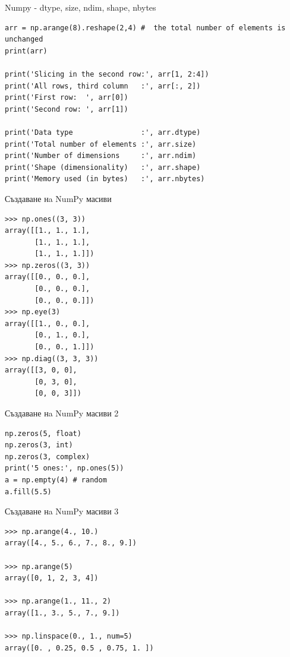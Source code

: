 \documentclass{beamer}
\begin{document}
\begin{frame}[fragile]{Numpy - dtype, size, ndim, shape, nbytes}
\begin{lstlisting}
arr = np.arange(8).reshape(2,4) #  the total number of elements is unchanged
print(arr)

print('Slicing in the second row:', arr[1, 2:4]) 
print('All rows, third column   :', arr[:, 2])
print('First row:  ', arr[0])
print('Second row: ', arr[1])

print('Data type                :', arr.dtype)
print('Total number of elements :', arr.size)
print('Number of dimensions     :', arr.ndim)
print('Shape (dimensionality)   :', arr.shape)
print('Memory used (in bytes)   :', arr.nbytes)
\end{lstlisting}

\end{frame}

\begin{frame}[fragile]{Създаване нa NumPy масиви}
\begin{verbatim}
>>> np.ones((3, 3))
array([[1., 1., 1.],
       [1., 1., 1.],
       [1., 1., 1.]])
>>> np.zeros((3, 3))
array([[0., 0., 0.],
       [0., 0., 0.],
       [0., 0., 0.]])
>>> np.eye(3)
array([[1., 0., 0.],
       [0., 1., 0.],
       [0., 0., 1.]])
>>> np.diag((3, 3, 3))
array([[3, 0, 0],
       [0, 3, 0],
       [0, 0, 3]])
\end{verbatim}
\end{frame}

\begin{frame}[fragile]{Създаване нa NumPy масиви 2}
\begin{lstlisting}
np.zeros(5, float)
np.zeros(3, int)
np.zeros(3, complex)
print('5 ones:', np.ones(5))
a = np.empty(4) # random
a.fill(5.5)
\end{lstlisting}

\end{frame}


\begin{frame}[fragile]{Създаване нa NumPy масиви 3}
\begin{verbatim}
>>> np.arange(4., 10.)
array([4., 5., 6., 7., 8., 9.])

>>> np.arange(5)
array([0, 1, 2, 3, 4])

>>> np.arange(1., 11., 2)
array([1., 3., 5., 7., 9.])

>>> np.linspace(0., 1., num=5)
array([0. , 0.25, 0.5 , 0.75, 1. ])
\end{verbatim}
\end{frame}
\end{document}
